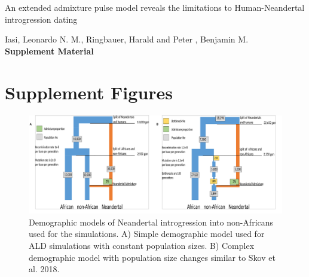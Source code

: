 \documentclass[11pt]{article}
\begin{document}
\begin{titlepage}


    \vspace*{1cm}
        
        
    \begin{center}       
        \large
        \vspace{1cm}
        An extended admixture pulse model reveals the limitations to Human-Neandertal introgression dating
        
       \vspace{1.0cm}
        \large
        Iasi, Leonardo N. M., Ringbauer, Harald  and Peter , Benjamin M. \\ 
        
        \vspace{1.0cm}
            \Huge
            \textbf{Supplement Material}
    \end{center} 

            

\end{titlepage}

\section{Supplement Figures}

\begin{figure}
\centering
\includegraphics{Admixture_Time_Inference_Paper_Draft_files/figure-latex/Simple_and_Skov.pdf}
\caption{\label{fig:figS1} Demographic models of Neandertal introgression into non-Africans used for the simulations. A) Simple demographic model used for ALD simulations with constant population sizes. B) Complex demographic model with population size changes similar to  Skov et al. 2018.}
\end{figure}
\end{document}

